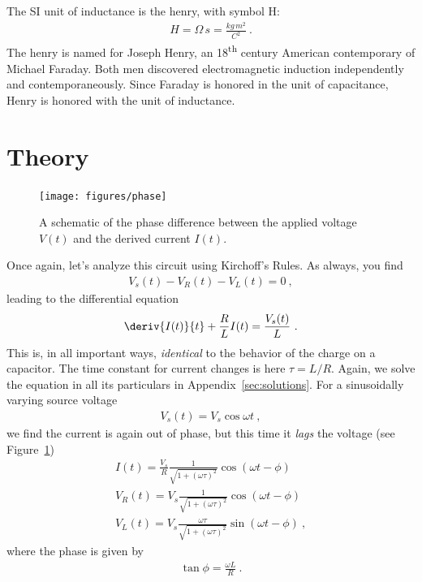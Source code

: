 \documentclass[12pt]{article}
\begin{document}
The SI unit of inductance is the henry, with symbol \unit{H}:
\begin{gather*}
  \unit{H} = \unit{\Omega\, s} = \unit{\frac{kg\, m^2}{C^2}}\ .
\end{gather*}
The henry is named for Joseph Henry, an 18\textsuperscript{th} century
American contemporary of Michael Faraday.  Both men discovered
electromagnetic induction independently and contemporaneously.  Since
Faraday is honored in the unit of capacitance, Henry is honored with
the unit of inductance.

\section{Theory}
\label{sec:theory}

\begin{figure}
  \centering
  \texttt{[image: figures/phase]}
  \caption{A schematic of the phase difference between the applied
    voltage $V(t)$ and the derived current $I(t)$.}
  \label{fig:phase}
\end{figure}
Once again, let's analyze this circuit using Kirchoff's Rules.  As
always, you find
\begin{gather*}
  V_s(t) - V_R(t) - V_L(t) = 0\ ,
\end{gather*}
leading to the differential equation
\begin{gather*}
  \deriv{I(t)}{t} + \frac{R}{L} I(t) = \frac{V_s(t)}{L}\ .
\end{gather*}
This is, in all important ways, \textit{identical} to the behavior of
the charge on a capacitor.  The time constant for current changes is
here $\tau = L/R$.  Again, we solve the equation in all its
particulars in Appendix~\ref{sec:solutions}.  For a sinusoidally
varying source voltage
\begin{gather*}
  V_s(t) = V_s \cos\omega t\ ,
\end{gather*}
we find the current is again out of phase, but this time it
\textit{lags} the voltage (see Figure~\ref{fig:phase})
\begin{gather*}
  I(t) = \frac{V_s}{R} \frac{1}{\sqrt{1 + (\omega \tau)^2}}
  \cos(\omega t - \phi)\\
  V_R(t) = V_s \frac{1}{\sqrt{1 + (\omega \tau)^2}}
  \cos(\omega t - \phi)\\
  V_L(t) = V_s \frac{\omega \tau}{\sqrt{1 + (\omega \tau)^2}}
  \sin(\omega t - \phi)\ ,
\end{gather*}
where the phase is given by 
\begin{gather*}
  \tan \phi = \frac{\omega L}{R}\ .
\end{gather*}
\end{document}
